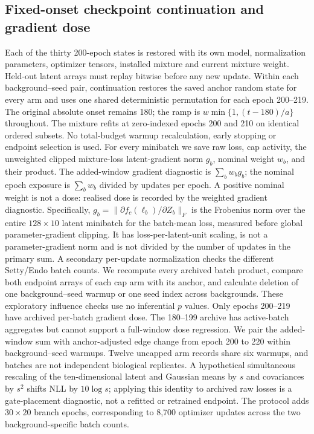 \documentclass[11pt]{article}
\begin{document}
\subsection{Fixed-onset checkpoint continuation and gradient dose}
Each of the thirty 200-epoch states is restored with its own model,
normalization parameters, optimizer tensors, installed mixture and
current mixture weight. Held-out latent arrays must replay bitwise before
any new update. Within each background--seed pair, continuation restores
the saved anchor random state for every arm and uses one shared deterministic
permutation for each epoch 200--219. The original absolute onset remains
180; the ramp is $w\min\{1,(t-180)/a\}$ throughout. The mixture refits at
zero-indexed epochs 200 and 210 on identical ordered subsets. No total-budget
warmup recalculation, early stopping or endpoint selection is used.
For every minibatch we save raw loss, cap activity, the unweighted clipped
mixture-loss latent-gradient norm $g_b$, nominal weight $w_b$, and their
product. The added-window gradient diagnostic is $\sum_b w_b g_b$; the
nominal epoch exposure is $\sum_b w_b$ divided by updates per epoch. A positive nominal
weight is not a dose: realised dose is recorded by the weighted gradient diagnostic.
Specifically, $g_b=\|\partial f_c(\ell_b)/\partial Z_b\|_F$ is the Frobenius norm over the entire $128\times10$ latent minibatch for the batch-mean loss, measured before global parameter-gradient clipping. It has loss-per-latent-unit scaling, is not a parameter-gradient norm and is not divided by the number of updates in the primary sum. A secondary per-update normalization checks the different Setty/Endo batch counts. We recompute every archived batch product, compare both endpoint arrays of each cap arm with its anchor, and calculate deletion of one background--seed warmup or one seed index across backgrounds. These exploratory influence checks use no inferential $p$ values.
Only epochs 200--219 have archived per-batch gradient dose. The 180--199 archive has active-batch aggregates but cannot support a full-window dose regression. We pair the added-window sum with anchor-adjusted edge change from epoch 200 to 220 within background--seed warmups. Twelve uncapped arm records share six warmups, and batches are not independent biological replicates. A hypothetical simultaneous rescaling of the ten-dimensional latent and Gaussian means by $s$ and covariances by $s^2$ shifts NLL by $10\log s$; applying this identity to archived raw losses is a gate-placement diagnostic, not a refitted or retrained endpoint.
The protocol adds $30\times20$ branch epochs, corresponding to 8,700
optimizer updates across the two background-specific batch counts.
\end{document}
